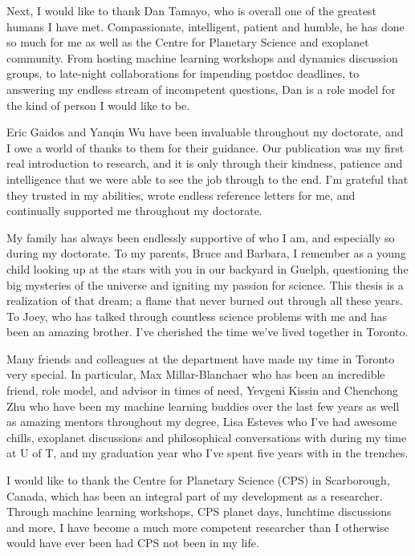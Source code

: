 \documentclass[letterpaper]{ut-thesis} %
\begin{document}
\begin{preliminary}
\begin{acknowledgements}
Next, I would like to thank Dan Tamayo, who is overall one of the greatest humans I have met. 
Compassionate, intelligent, patient and humble, he has done so much for me as well as the Centre for Planetary Science and exoplanet community. 
From hosting machine learning workshops and dynamics discussion groups, to late-night collaborations for impending postdoc deadlines, to answering my endless stream of incompetent questions, Dan is a role model for the kind of person I would like to be. 

Eric Gaidos and Yanqin Wu have been invaluable throughout my doctorate, and I owe a world of thanks to them for their guidance. 
Our publication was my first real introduction to research, and it is only through their kindness, patience and intelligence that we were able to see the job through to the end. 
I'm grateful that they trusted in my abilities, wrote endless reference letters for me, and continually supported me throughout my doctorate.

My family has always been endlessly supportive of who I am, and especially so during my doctorate.
To my parents, Bruce and Barbara, I remember as a young child looking up at the stars with you in our backyard in Guelph, questioning the big mysteries of the universe and igniting my passion for science.
This thesis is a realization of that dream; a flame that never burned out through all these years. 
To Joey, who has talked through countless science problems with me and has been an amazing brother.
I've cherished the time we've lived together in Toronto. 

Many friends and colleagues at the department have made my time in Toronto very special. 
In particular, Max Millar-Blanchaer who has been an incredible friend, role model, and advisor in times of need, Yevgeni Kissin and Chenchong Zhu who have been my machine learning buddies over the last few years as well as amazing mentors throughout my degree, Lisa Esteves who I've had awesome chills, exoplanet discussions and philosophical conversations with during my time at U of T, and my graduation year who I've spent five years with in the trenches.  

I would like to thank the Centre for Planetary Science (CPS) in Scarborough, Canada, which has been an integral part of my development as a researcher. 
Through machine learning workshops, CPS planet days, lunchtime discussions and more, I have become a much more competent researcher than I otherwise would have ever been had CPS not been in my life. 


\end{acknowledgements}
\end{preliminary}
\end{document}
